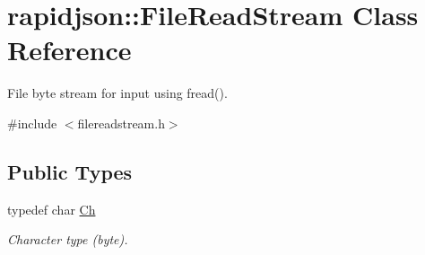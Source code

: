 \hypertarget{classrapidjson_1_1_file_read_stream}{}\section{rapidjson\+::File\+Read\+Stream Class Reference}
\label{classrapidjson_1_1_file_read_stream}


File byte stream for input using fread().  




{\ttfamily \#include $<$filereadstream.\+h$>$}

\subsection*{Public Types}
\begin{DoxyCompactItemize}
\item 
typedef char \mbox{\hyperlink{classrapidjson_1_1_file_read_stream_a4a5f34875b40d22def206c9a09ecd929}{Ch}}
\begin{DoxyCompactList}\small\item\em Character type (byte). \end{DoxyCompactList}\end{DoxyCompactItemize}
